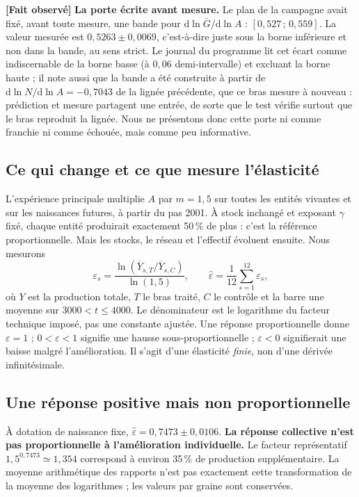 \documentclass[11pt,a4paper]{article}
\newcommand{\fait}{\textbf{[Fait observé]}}
\begin{document}
\fait{} \textbf{La porte écrite avant mesure.} Le plan de la campagne avait fixé,
avant toute mesure, une bande pour $\mathrm{d}\ln\bar G/\mathrm{d}\ln A$ :
$[0{,}527\,;\,0{,}559]$. La valeur mesurée est $0{,}5263\pm0{,}0069$, c'est-à-dire
juste sous la borne inférieure et non dans la bande, au sens strict. Le
journal du programme lit cet écart comme indiscernable de la borne basse (à
$0{,}06$ demi-intervalle) et excluant la borne haute ; il note aussi que la
bande a été construite à partir de $\mathrm{d}\ln N/\mathrm{d}\ln A=-0{,}7043$ de la
lignée précédente, que ce bras mesure à nouveau : prédiction et mesure
partagent une entrée, de sorte que le test vérifie surtout que le bras
reproduit la lignée. Nous ne présentons donc cette porte ni comme franchie
ni comme échouée, mais comme peu informative.

\subsection{Ce qui change et ce que mesure l'élasticité}
L'expérience principale multiplie $A$ par $m=1{,}5$ sur toutes les
entités vivantes et sur les naissances futures, à partir du pas 2001.
À stock inchangé et exposant $\gamma$ fixé, chaque entité produirait
exactement 50\,\% de plus : c'est la référence proportionnelle.
Mais les stocks, le réseau et l'effectif évoluent ensuite. Nous mesurons
\begin{equation}
 \varepsilon_s=\frac{\ln(\overline Y_{s,T}/\overline Y_{s,C})}{\ln(1{,}5)},
 \qquad \widehat\varepsilon=\frac1{12}\sum_{s=1}^{12}\varepsilon_s,
 \label{eq:eps}
\end{equation}
où $Y$ est la production totale, $T$ le bras traité, $C$ le contrôle et
la barre une moyenne sur $3000<t\le4000$. Le dénominateur est le
logarithme du facteur technique imposé, pas une constante ajustée.
Une réponse proportionnelle donne $\varepsilon=1$ ; $0<\varepsilon<1$
signifie une hausse sous-proportionnelle ; $\varepsilon<0$ signifierait
une baisse malgré l'amélioration. Il s'agit d'une élasticité \emph{finie},
non d'une dérivée infinitésimale.

\subsection{Une réponse positive mais non proportionnelle}
À dotation de naissance fixe, $\widehat\varepsilon=0{,}7473\pm0{,}0106$.
\textbf{La réponse collective n'est pas proportionnelle à l'amélioration
individuelle.} Le facteur représentatif $1{,}5^{0{,}7473}\simeq1{,}354$
correspond à environ 35\,\% de production supplémentaire. La moyenne
arithmétique des rapports n'est pas exactement cette transformation de
la moyenne des logarithmes ; les valeurs par graine sont conservées.
\end{document}
